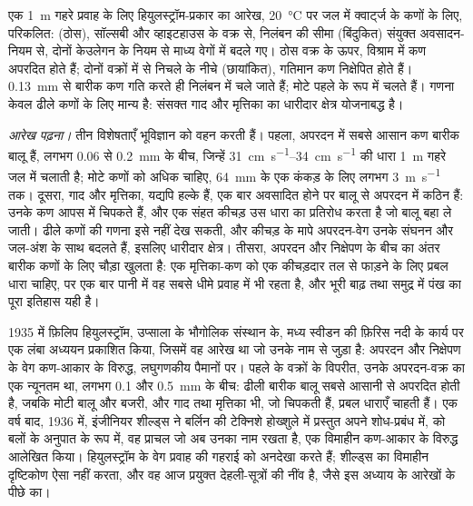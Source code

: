 \begin{omfigure}
{\small एक \qty{1}{m} गहरे प्रवाह के लिए हियुलस्ट्रॉम-प्रकार का आरेख, \qty{20}{\celsius} पर जल में क्वार्ट्ज के कणों के लिए, परिकलित:  (ठोस), सॉल्सबी और व्हाइटहाउस के वक्र से, निलंबन की सीमा (बिंदुकित) संयुक्त अवसादन-नियम से, दोनों केउलेगन के नियम से माध्य वेगों में बदले गए। ठोस वक्र के ऊपर, विश्राम में कण अपरदित होते हैं; दोनों वक्रों में से निचले के नीचे (छायांकित), गतिमान कण निक्षेपित होते हैं। \qty{0.13}{mm} से बारीक कण गति करते ही निलंबन में चले जाते हैं; मोटे पहले  के रूप में चलते हैं। गणना केवल ढीले कणों के लिए मान्य है: संसक्त गाद और मृत्तिका का धारीदार क्षेत्र योजनाबद्ध है।}
\label{fig:b1:erosion-transport:hjulstrom}
\end{omfigure}

\emph{आरेख पढ़ना।} तीन विशेषताएँ भूविज्ञान को वहन करती हैं। पहला, अपरदन में सबसे आसान कण बारीक बालू हैं, लगभग \num{0.06} से \qty{0.2}{mm} के बीच, जिन्हें \qtyrange{31}{34}{cm.s^{-1}} की धारा \qty{1}{m} गहरे जल में चलाती है; मोटे कणों को अधिक चाहिए, \qty{64}{mm} के एक कंकड़ के लिए लगभग \qty{3}{m.s^{-1}} तक। दूसरा, गाद और मृत्तिका, यद्यपि हल्के हैं, एक बार अवसादित होने पर बालू से अपरदन में कठिन हैं: उनके कण आपस में चिपकते हैं, और एक संहत कीचड़ उस धारा का प्रतिरोध करता है जो बालू बहा ले जाती। ढीले कणों की गणना इसे नहीं देख सकती, और कीचड़ के मापे अपरदन-वेग उनके संघनन और जल-अंश के साथ बदलते हैं, इसलिए धारीदार क्षेत्र। तीसरा, अपरदन और निक्षेपण के बीच का अंतर बारीक कणों के लिए चौड़ा खुलता है: एक मृत्तिका-कण को एक कीचड़दार तल से फाड़ने के लिए प्रबल धारा चाहिए, पर एक बार पानी में वह सबसे धीमे प्रवाह में भी रहता है, और भूरी बाढ़ तथा समुद्र में पंख का पूरा इतिहास यही है।

\begin{history}
1935 में फ़िलिप हियुलस्ट्रॉम, उप्साला के भौगोलिक संस्थान के, मध्य स्वीडन की फ़िरिस नदी के कार्य पर एक लंबा अध्ययन प्रकाशित किया, जिसमें वह आरेख था जो उनके नाम से जुड़ा है: अपरदन और निक्षेपण के वेग कण-आकार के विरुद्ध, लघुगणकीय पैमानों पर। पहले के वक्रों के विपरीत, उनके अपरदन-वक्र का एक न्यूनतम था, लगभग \num{0.1} और \qty{0.5}{mm} के बीच: ढीली बारीक बालू सबसे आसानी से अपरदित होती है, जबकि मोटी बालू और बजरी, और गाद तथा मृत्तिका भी, जो चिपकती हैं, प्रबल धाराएँ चाहती हैं। एक वर्ष बाद, 1936 में, इंजीनियर शील्ड्स ने बर्लिन की टेक्निशे होख्शुले में प्रस्तुत अपने शोध-प्रबंध में,  को बलों के अनुपात के रूप में, वह प्राचल जो अब उनका नाम रखता है, एक विमाहीन कण-आकार के विरुद्ध आलेखित किया। हियुलस्ट्रॉम के वेग प्रवाह की गहराई को अनदेखा करते हैं; शील्ड्स का विमाहीन दृष्टिकोण ऐसा नहीं करता, और वह आज प्रयुक्त देहली-सूत्रों की नींव है, जैसे इस अध्याय के आरेखों के पीछे का।
\end{history}

